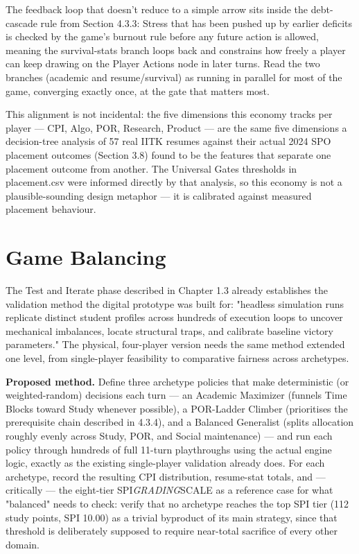 The feedback loop that doesn't reduce to a simple arrow sits inside the debt-cascade rule from Section 4.3.3: Stress that has been pushed up by earlier deficits is checked by the game's burnout rule before any future action is allowed, meaning the survival-stats branch loops back and constrains how freely a player can keep drawing on the Player Actions node in later turns. Read the two branches (academic and resume/survival) as running in parallel for most of the game, converging exactly once, at the gate that matters most.

This alignment is not incidental: the five dimensions this economy tracks per player --- CPI, Algo, POR, Research, Product --- are the same five dimensions a decision-tree analysis of 57 real IITK resumes against their actual 2024 SPO placement outcomes (Section 3.8) found to be the features that separate one placement outcome from another. The Universal Gates thresholds in placement.csv were informed directly by that analysis, so this economy is not a plausible-sounding design metaphor --- it is calibrated against measured placement behaviour.

\section{Game Balancing}

The Test and Iterate phase described in Chapter 1.3 already establishes the validation method the digital prototype was built for: "headless simulation runs replicate distinct student profiles across hundreds of execution loops to uncover mechanical imbalances, locate structural traps, and calibrate baseline victory parameters." The physical, four-player version needs the same method extended one level, from single-player feasibility to comparative fairness across archetypes.

\textbf{Proposed method.} Define three archetype policies that make deterministic (or weighted-random) decisions each turn --- an Academic Maximizer (funnels Time Blocks toward Study whenever possible), a POR-Ladder Climber (prioritises the prerequisite chain described in 4.3.4), and a Balanced Generalist (splits allocation roughly evenly across Study, POR, and Social maintenance) --- and run each policy through hundreds of full 11-turn playthroughs using the actual engine logic, exactly as the existing single-player validation already does. For each archetype, record the resulting CPI distribution, resume-stat totals, and --- critically --- the eight-tier SPI\emph{GRADING}SCALE as a reference case for what "balanced" needs to check: verify that no archetype reaches the top SPI tier (112 study points, SPI 10.00) as a trivial byproduct of its main strategy, since that threshold is deliberately supposed to require near-total sacrifice of every other domain.

